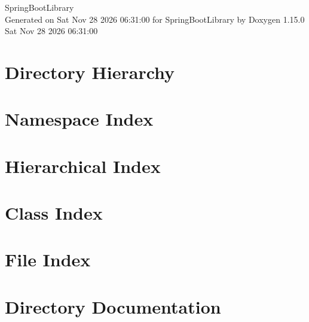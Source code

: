\documentclass[twoside]{book}
\newcommand{\+}{\discretionary{\mbox{\scriptsize$\hookleftarrow$}}{}{}}
\newcommand{\clearemptydoublepage}{%
    \newpage{\pagestyle{empty}\cleardoublepage}%
  }
\begin{document}
  \raggedbottom
    \hypersetup{pageanchor=false,
                bookmarksnumbered=true,
                pdfencoding=unicode
               }
  \begin{titlepage}
  \vspace*{7cm}
  \begin{center}%
  {\Large Spring\+Boot\+Library}\\
  \vspace*{1cm}
  {\large Generated on Sat Nov 28 2026 06\+:31\+:00 for Spring\+Boot\+Library by Doxygen 1.15.0}\\
    \vspace*{0.5cm}
    {\small Sat Nov 28 2026 06:31:00}
  \end{center}
  \end{titlepage}
  \clearemptydoublepage
  \tableofcontents
  \clearemptydoublepage
  \hypersetup{pageanchor=true}
\chapter{Directory Hierarchy}

\chapter{Namespace Index}

\chapter{Hierarchical Index}

\chapter{Class Index}

\chapter{File Index}

\chapter{Directory Documentation}



















\end{document}
